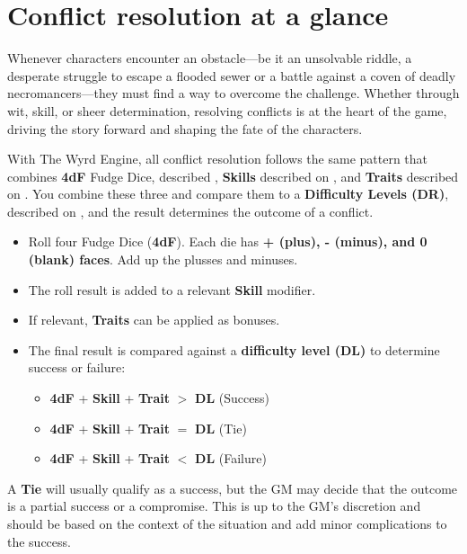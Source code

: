\section{Conflict resolution at a glance}

Whenever characters encounter an obstacle—be it an unsolvable riddle, a desperate struggle to escape a flooded sewer or a battle against a coven of deadly necromancers—they must find a way to overcome the challenge. Whether through wit, skill, or sheer determination, resolving conflicts is at the heart of the game, driving the story forward and shaping the fate of the characters.

With The Wyrd Engine, all conflict resolution follows the same pattern that combines \textbf{4dF} Fudge Dice, described , \textbf{Skills} described on , and \textbf{Traits} described on . You combine these three and compare them to a \textbf{Difficulty Levels (DR)}, described on , and the result determines the outcome of a conflict.

\begin{Example}
	\begin{itemize}
		\item Roll four Fudge Dice (\textbf{4dF}).
		      Each die has \textbf{+ (plus), - (minus), and 0 (blank) faces}. Add up the plusses and minuses.
		\item The roll result is added to a relevant \textbf{Skill} modifier.
		\item If relevant, \textbf{Traits} can be applied as bonuses.
		\item The final result is compared against a \textbf{difficulty level (DL)} to determine success or failure:
		\begin{itemize}
			\item \textbf{4dF} + \textbf{Skill} + \textbf{Trait} $>$ \textbf{DL} (Success)	
			\item \textbf{4dF} + \textbf{Skill} + \textbf{Trait} $=$ \textbf{DL} (Tie)
			\item \textbf{4dF} + \textbf{Skill} + \textbf{Trait} $<$ \textbf{DL} (Failure)
		\end{itemize}
	\end{itemize}
\end{Example}

A \textbf{Tie} will usually qualify as a success, but the GM may decide that the outcome is a partial success or a compromise. This is up to the GM's discretion and should be based on the context of the situation and add minor complications to the success.

